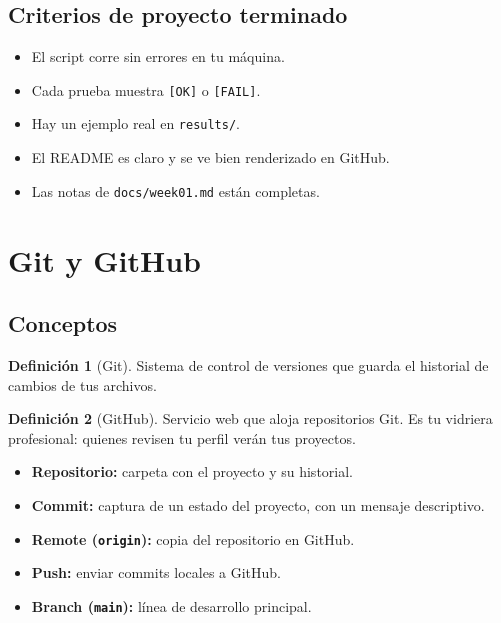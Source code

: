 \documentclass[11pt,a4paper]{article}
\theoremstyle{definition}
\newtheorem{definicion}{Definición}[section]
\theoremstyle{remark}
\begin{document}
\subsection{Criterios de proyecto terminado}

\begin{itemize}[label=$\square$]
  \item El script corre sin errores en tu máquina.
  \item Cada prueba muestra \texttt{[OK]} o \texttt{[FAIL]}.
  \item Hay un ejemplo real en \texttt{results/}.
  \item El README es claro y se ve bien renderizado en GitHub.
  \item Las notas de \texttt{docs/week01.md} están completas.
\end{itemize}

\section{Git y GitHub}\label{sec:git}

\subsection{Conceptos}

\begin{definicion}[Git]
Sistema de control de versiones que guarda el historial de cambios de tus archivos.
\end{definicion}

\begin{definicion}[GitHub]
Servicio web que aloja repositorios Git. Es tu vidriera profesional: quienes revisen tu perfil verán tus proyectos.
\end{definicion}

\begin{itemize}
  \item \textbf{Repositorio:} carpeta con el proyecto y su historial.
  \item \textbf{Commit:} captura de un estado del proyecto, con un mensaje descriptivo.
  \item \textbf{Remote (\texttt{origin}):} copia del repositorio en GitHub.
  \item \textbf{Push:} enviar commits locales a GitHub.
  \item \textbf{Branch (\texttt{main}):} línea de desarrollo principal.
\end{itemize}
\end{document}
